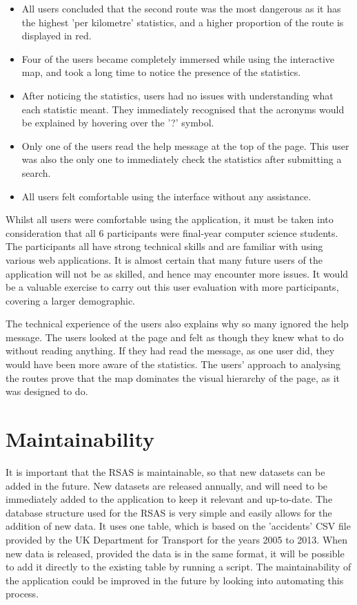 \documentclass[authoryearcitations]{UoYCSproject}
\begin{document}
\begin{itemize}
	\item All users concluded that the second route was the most dangerous as it has the highest 'per kilometre' statistics, and a higher proportion of the route is displayed in red.
	\item Four of the users became completely immersed while using the interactive map, and took a long time to notice the presence of the statistics. 
	\item After noticing the statistics, users had no issues with understanding what each statistic meant. They immediately recognised that the acronyms would be explained by hovering over the '?' symbol.
	\item Only one of the users read the help message at the top of the page. This user was also the only one to immediately check the statistics after submitting a search.
	\item All users felt comfortable using the interface without any assistance.
\end{itemize}

Whilst all users were comfortable using the application, it must be taken into consideration that all 6 participants were final-year computer science students. The participants all have strong technical skills and are familiar with using various web applications. It is almost certain that many future users of the application will not be as skilled, and hence may encounter more issues. It would be a valuable exercise to carry out this user evaluation with more participants, covering a larger demographic.

The technical experience of the users also explains why so many ignored the help message. The users looked at the page and felt as though they knew what to do without reading anything. If they had read the message, as one user did, they would have been more aware of the statistics. The users' approach to analysing the routes prove that the map dominates the visual hierarchy of the page, as it was designed to do.

\section{Maintainability}

It is important that the RSAS is maintainable, so that new datasets can be added in the future. New datasets are released annually, and will need to be immediately added to the application to keep it relevant and up-to-date. The database structure used for the RSAS is very simple and easily allows for the addition of new data. It uses one table, which is based on the 'accidents' CSV file provided by the UK Department for Transport for the years 2005 to 2013. When new data is released, provided the data is in the same format, it will be possible to add it directly to the existing table by running a script. The maintainability of the application could be improved in the future by looking into automating this process.
\end{document}
